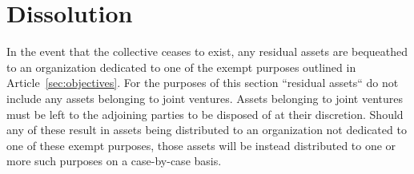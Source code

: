 \chapter{Dissolution}\label{sec:dissolution}
In the event that the collective ceases to exist, any residual assets are bequeathed to an organization dedicated to one of the exempt purposes outlined in Article~\ref{sec:objectives}. For the purposes of this section ``residual assets`` do not include any assets belonging to joint ventures. Assets belonging to joint ventures must be left to the adjoining parties to be disposed of at their discretion. Should any of these result in assets being distributed to an organization not dedicated to one of these exempt purposes, those assets will be instead distributed to one or more such purposes on a case-by-case basis.

